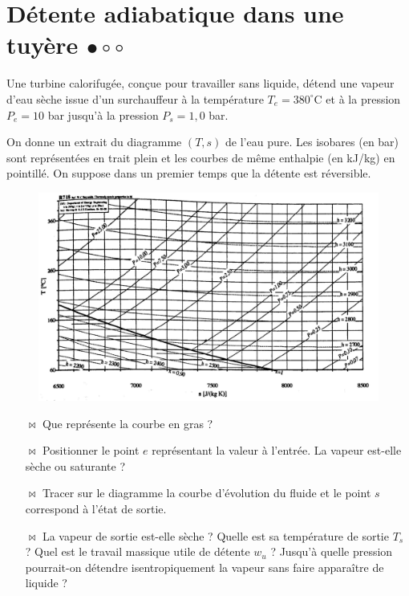 \documentclass{report}
\begin{document}
\section*{Détente adiabatique dans une tuyère $\bullet\circ\circ$}

Une turbine calorifugée, conçue pour travailler sans liquide, détend une vapeur d'eau sèche issue d'un surchauffeur à la température $T_e=380^\circ$C et à la pression $P_e=10$ bar jusqu'à la pression $P_s=1,0$ bar. 

On donne un extrait du diagramme $(T,s)$ de l'eau pure. Les isobares (en bar) sont représentées en trait plein et les courbes de même enthalpie (en kJ/kg) en pointillé. On suppose dans un premier temps que la détente est réversible.

\begin{figure}[!h]
\centering
\includegraphics[width=0.8\linewidth]{diagramme_TS.png}
\end{figure}

\begin{itemize}

	\item[$\bowtie$] Que représente la courbe en gras ?
	
	\item[$\bowtie$] Positionner le point $e$ représentant la valeur à l'entrée. La vapeur est-elle sèche ou saturante ?
	
		\item[$\bowtie$]  Tracer sur le diagramme la courbe d'évolution du fluide et le point $s$ correspond à l'état de sortie.
		
		\item[$\bowtie$] La vapeur de sortie est-elle sèche ? Quelle est sa température de sortie $T_s$ ? Quel est le travail massique utile de détente $w_u$ ? Jusqu'à quelle pression pourrait-on détendre isentropiquement la vapeur sans faire apparaître de liquide ?
		
\end{itemize}
\end{document}
